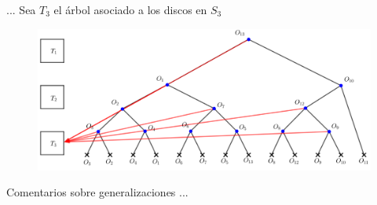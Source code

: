 \begin{frame}{...}
  Sea $T_3$ el árbol asociado a los discos en $S_3$

  \begin{figure}  
    \centering
    \includegraphics[width=1\textwidth]{./Images/Range4.png}
  \end{figure}
\end{frame}


\begin{frame}
  Comentarios sobre generalizaciones ...
\end{frame}
